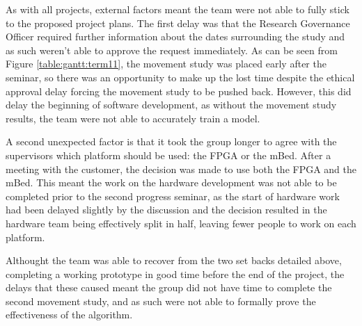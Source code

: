 As with all projects, external factors meant the team were not able to fully stick to the proposed project plans. The first delay was that the Research Governance Officer required further information about the dates surrounding the study and as such weren't able to approve the request immediately. As can be seen from Figure \ref{table:gantt:term11}, the movement study was placed early after the seminar, so there was an opportunity to make up the lost time despite the ethical approval delay forcing the movement study to be pushed back. However, this did delay the beginning of software development, as without the movement study results, the team were not able to accurately train a model.

A second unexpected factor is that it took the group longer to agree with the supervisors which platform should be used: the FPGA or the mBed. After a meeting with the customer, the decision was made to use both the FPGA and the mBed. This meant the work on the hardware development was not able to be completed prior to the second progress seminar, as the start of hardware work had been delayed slightly by the discussion and the decision resulted in the hardware team being effectively split in half, leaving fewer people to work on each platform.

Althought the team was able to recover from the two set backs detailed above, completing a working prototype in good time before the end of the project, the delays that these caused meant the group did not have time to complete the second movement study, and as such were not able to formally prove the effectiveness of the algorithm.
